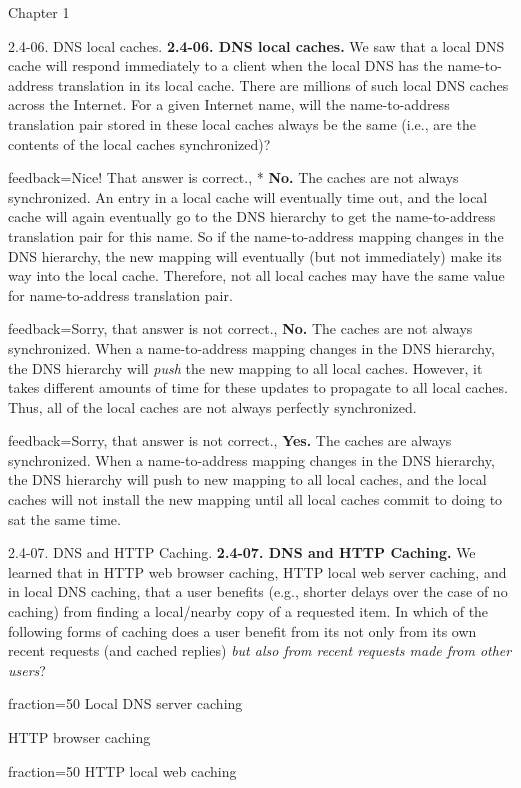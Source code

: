 \documentclass[a4paper]{article}
\begin{document}
\begin{quiz}{Chapter 1}
\begin{multi}[points=1,shuffle]{2.4-06. DNS local caches.}
\textbf{2.4-06. DNS local caches.} We saw that a local DNS cache will respond immediately to a client when the local DNS has the name-to-address translation in its local cache. There are millions of such local DNS caches across the Internet. For a given Internet name, will the name-to-address translation pair stored in these local caches always be the same (i.e., are the contents of the local caches synchronized)?
\item[feedback={Nice!  That answer is correct.},]* \textbf{No.  }The caches are not always synchronized.  An entry in a local cache will eventually time out, and the local cache will again eventually go to the DNS hierarchy to get the name-to-address translation pair for this name.  So if the name-to-address mapping changes in the DNS hierarchy, the new mapping will eventually (but not immediately) make its way into the local cache.  Therefore, not all local caches may have the same value for name-to-address translation pair.
\item[feedback={Sorry, that answer is not correct.},] \textbf{No.  }The caches are not always synchronized.  When a name-to-address mapping changes in the DNS hierarchy, the DNS hierarchy will \emph{push} the new mapping to all local caches.  However,  it takes different amounts of time for these updates to propagate to all local caches.  Thus, all of the local caches are not always perfectly synchronized.
\item[feedback={Sorry, that answer is not correct.},] \textbf{Yes.  }The caches are always synchronized.  When a name-to-address mapping changes in the DNS hierarchy, the DNS hierarchy will push to new mapping to all local caches, and the local caches will not install the new mapping until all local caches commit to doing to sat the same time.
\end{multi}

\begin{multi}[points=1,shuffle,multiple]{2.4-07. DNS and HTTP Caching.}
\textbf{2.4-07. DNS and HTTP Caching.} We learned that in HTTP web browser caching, HTTP local web server caching, and in local DNS caching, that a user benefits (e.g., shorter delays over the case of no caching) from finding a local/nearby copy of a requested item. In which of the following forms of caching does a user benefit from its not only from its own recent requests (and cached replies) \emph{but also from recent requests made from other users}?
\item[fraction=50] Local DNS server caching
\item HTTP browser caching
\item[fraction=50] HTTP local web caching
\end{multi}


\end{quiz}
\end{document}
